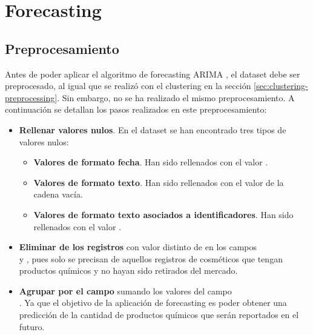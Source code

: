 
\section{Forecasting}





\subsection{Preprocesamiento}

Antes de poder aplicar el algoritmo de forecasting ARIMA \citep{arima}, el dataset debe ser preprocesado, al igual que se realizó con el clustering en la sección \ref{sec:clustering-preprocessing}. Sin embargo, no se ha realizado el mismo preprocesamiento. A continuación se detallan los pasos realizados en este preprocesamiento:

\begin{itemize}
 \item \textbf{Rellenar valores nulos}. En el dataset se han encontrado tres tipos de valores nulos: 
 \begin{itemize}
  \item \textbf{Valores de formato fecha}. Han sido rellenados con el valor .
  \item \textbf{Valores de formato texto}. Han sido rellenados con el valor de la cadena vacía.
  \item \textbf{Valores de formato texto asociados a identificadores}. Han sido rellenados con el valor .
 \end{itemize}
 
 \item \textbf{Eliminar de los registros} con valor distinto de  en los campos \\  y , pues solo se precisan de aquellos registros de cosméticos que tengan productos químicos y no hayan sido retirados del mercado.

 \item \textbf{Agrupar por el campo}  sumando los valores del campo \\ . Ya que el objetivo de la aplicación de forecasting es poder obtener una predicción de la cantidad de productos químicos que serán reportados en el futuro.
\end{itemize}

